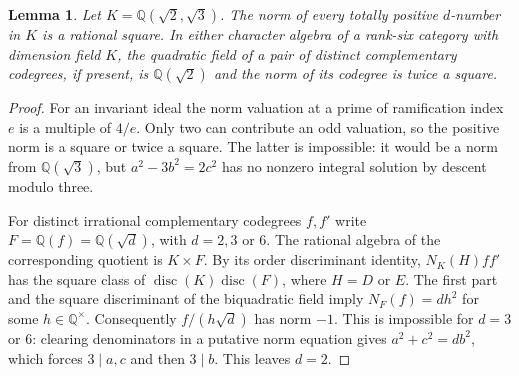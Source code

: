 \documentclass[11pt,reqno]{amsart}
\newtheorem{lemma}[theorem]{Lemma}
\theoremstyle{remark}\newtheorem{remark}[theorem]{Remark}
\numberwithin{equation}{section}
\begin{document}
\begin{lemma}\label{lem:round2-quartic24-norm}
Let $K=\mathbb Q(\sqrt2,\sqrt3)$. The norm of every totally positive $d$-number in $K$ is a rational square. In either character algebra of a rank-six category with dimension field $K$, the quadratic field of a pair of distinct complementary codegrees, if present, is $\mathbb Q(\sqrt2)$ and the norm of its codegree is twice a square.
\end{lemma}
\begin{proof}
For an invariant ideal the norm valuation at a prime of ramification
index $e$ is a multiple of $4/e$. Only two can contribute an odd
valuation, so the positive norm is a square or twice a square. The
latter is impossible: it would be a norm from $\mathbb Q(\sqrt3)$,
but $a^2-3b^2=2c^2$ has no nonzero integral solution by descent
modulo three.

For distinct irrational complementary codegrees $f,f'$ write $F=\mathbb Q(f)=\mathbb Q(\sqrt d)$, with $d=2,3$ or $6$. The rational algebra of the corresponding quotient is $K\times F$. By its order discriminant identity, $N_K(H)ff'$ has the square class of $\operatorname{disc}(K)\operatorname{disc}(F)$, where $H=D$ or $E$. The first part and the square discriminant of the biquadratic field imply $N_F(f)=d h^2$ for some $h\in\mathbb Q^\times$. Consequently $f/(h\sqrt d)$ has norm $-1$. This is impossible for $d=3$ or $6$: clearing denominators in a putative norm equation gives $a^2+c^2=d b^2$, which forces $3\mid a,c$ and then $3\mid b$. This leaves $d=2$.
\end{proof}
\end{document}
